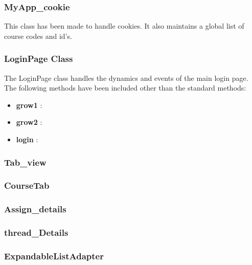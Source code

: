 \documentclass{article}
\begin{document}
\subsubsection{MyApp\_cookie}
\par\noindent This class has been made to handle cookies. It also maintains a global list of course codes and id's.

\subsubsection{LoginPage Class}
\par\noindent The LoginPage class handles the dynamics and events of the main login page. The following methods have been included other than the standard methods:
\begin{itemize}
 \item \textbf{grow1} : 
 \item \textbf{grow2} : 
 \item \textbf{login} : 

\end{itemize}

\subsubsection{Tab\_view}
\subsubsection{CourseTab}

\subsubsection{Assign\_details}
\subsubsection{thread\_Details}

\subsubsection{ExpandableListAdapter}
\par\noindent 


\end{document}
